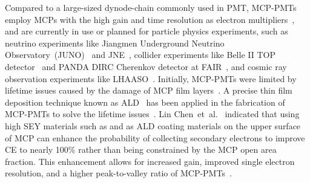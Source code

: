 Compared to a large-sized dynode-chain commonly used in PMT,
MCP-PMTs employ MCPs with the high gain and time resolution as electron multipliers~\cite{2021Summary},
and are currently in use or planned for particle physics experiments,
such as neutrino experiments like Jiangmen Underground Neutrino Observatory~(JUNO)~\cite{ZHU2020162002} and JNE~\cite{Zhang:2023ued},
collider experiments like Belle II TOP detector~\cite{MATSUOKA2014148} and PANDA DIRC Cherenkov detector at FAIR~\cite{KRAUSS2023168659},
and cosmic ray observation experiments like LHAASO~\cite{Cao2019UpgradingPT}.
Initially, MCP-PMTs were limited by lifetime issues
caused by the damage of MCP film layers~\cite{N2006Lifetime}.
A precise thin film deposition technique known as ALD~\cite{2012An}
has been applied in the fabrication of MCP-PMTs to solve the lifetime issues~\cite{Lehmann:2022ret}.
Lin Chen~et~al.~\cite{2016Optimization} indicated that using high SEY materials
such as  and  as ALD coating materials on the upper surface of MCP
can enhance the probability of collecting secondary electrons to improve CE
to nearly 100\% rather than being constrained by the MCP open area fraction.
This enhancement allows for increased gain, improved single electron resolution,
and a higher peak-to-valley ratio of MCP-PMTs~\cite{2021Effects}.

